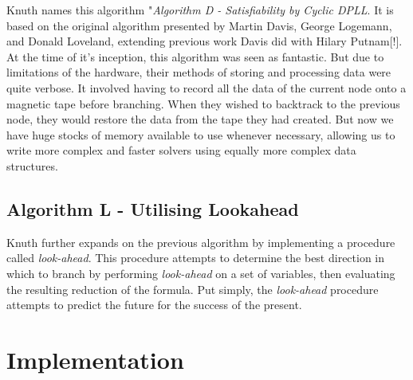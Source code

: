 \documentclass{article}
\begin{document}
Knuth names this algorithm "\textit{Algorithm D - Satisfiability by Cyclic DPLL}. It is based on the
original algorithm presented by Martin Davis, George Logemann, and Donald Loveland\cite{dpll},
extending previous work Davis did with Hilary Putnam[!]. At the time of it's inception, this
algorithm was seen as fantastic. But due to limitations of the hardware, their methods of storing
and processing data were quite verbose. It involved having to record all the data of the current
node onto a magnetic tape before branching. When they wished to backtrack to the previous node,
they would restore the data from the tape they had created. But now we have huge stocks of memory
available to use whenever necessary, allowing us to write more complex and faster solvers using
equally more complex data structures.

\subsection{Algorithm L - Utilising Lookahead}
Knuth further expands on the previous algorithm by implementing a procedure called \textit{look-ahead}. This procedure attempts to determine the best direction in which to branch by performing \textit{look-ahead} on a set of variables, then evaluating the resulting reduction of the formula. Put simply, the \textit{look-ahead} procedure attempts to predict the future for the success of the present.


\section{Implementation}
\end{document}
